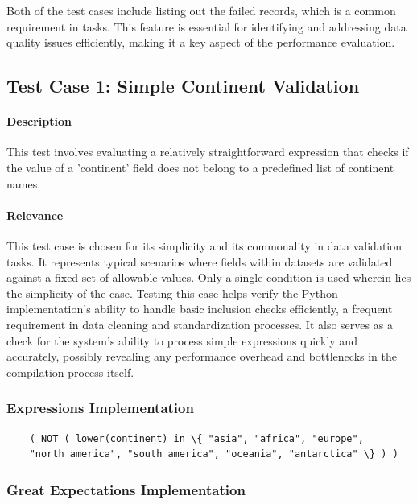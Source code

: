 Both of the test cases include listing out the failed records, which is a common requirement in  tasks. This feature is essential for identifying and addressing data quality issues efficiently, making it a key aspect of the performance evaluation.

\subsection{Test Case 1: Simple Continent Validation}

\paragraph{Description} This test involves evaluating a relatively straightforward expression that checks if the value of a 'continent' field does not belong to a predefined list of continent names. 

\paragraph{Relevance} This test case is chosen for its simplicity and its commonality in data validation tasks. It represents typical scenarios where fields within datasets are validated against a fixed set of allowable values.  Only a single condition is used wherein lies the simplicity of the case. Testing this case helps verify the Python implementation’s ability to handle basic inclusion checks efficiently, a frequent requirement in data cleaning and standardization processes. It also serves as a check for the system’s ability to process simple expressions quickly and accurately, possibly revealing any performance overhead and bottlenecks in the compilation process itself.

\subsubsection{Expressions Implementation}

\begin{verbatim}
    ( NOT ( lower(continent) in \{ "asia", "africa", "europe", 
    "north america", "south america", "oceania", "antarctica" \} ) )
\end{verbatim}

\subsubsection{Great Expectations Implementation}

